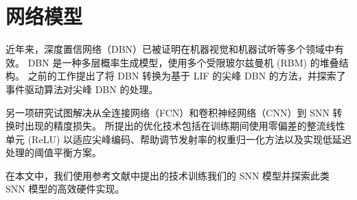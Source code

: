 


\section{网络模型}

近年来，深度置信网络（DBN）已被证明在机器视觉和机器试听等多个领域中有效。 
DBN 是一种多层概率生成模型，使用多个受限玻尔兹曼机 (RBM) 的堆叠结构。 
之前的工作提出了将 DBN 转换为基于 LIF 的尖峰 DBN 的方法，并探索了事件驱动算法对尖峰 DBN 的处理。

另一项研究试图解决从全连接网络（FCN）和卷积神经网络（CNN）到 SNN 转换时出现的精度损失。 
所提出的优化技术包括在训练期间使用零偏差的整流线性单元 (ReLU) 以适应尖峰编码、帮助调节发射率的权重归一化方法以及实现低延迟处理的阈值平衡方案。

在本文中，我们使用参考文献中提出的技术训练我们的 SNN 模型并探索此类 SNN 模型的高效硬件实现。
